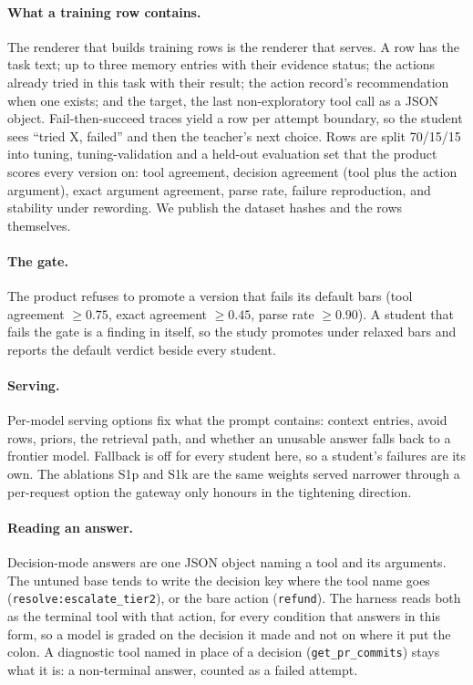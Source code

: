 \documentclass[11pt]{article}
\newcommand{\cond}[1]{\textsf{#1}}
\begin{document}
\paragraph{What a training row contains.} The renderer that builds training rows is the
renderer that serves. A row has the task text; up to three memory entries with their
evidence status; the actions already tried in this task with their result; the action
record's recommendation when one exists; and the target, the last non-exploratory tool call
as a JSON object. Fail-then-succeed traces yield a row per attempt boundary, so the student
sees ``tried X, failed'' and then the teacher's next choice. Rows are split 70/15/15 into
tuning, tuning-validation and a held-out evaluation set that the product scores every
version on: tool agreement, decision agreement (tool plus the action argument), exact
argument agreement, parse rate, failure reproduction, and stability under rewording. We
publish the dataset hashes and the rows themselves.

\paragraph{The gate.} The product refuses to promote a version that fails its default bars
(tool agreement $\geq 0.75$, exact agreement $\geq 0.45$, parse rate $\geq 0.90$). A student
that fails the gate is a finding in itself, so the study promotes under relaxed bars and
reports the default verdict beside every student.

\paragraph{Serving.} Per-model serving options fix what the prompt contains: context
entries, avoid rows, priors, the retrieval path, and whether an unusable answer falls back
to a frontier model. Fallback is off for every student here, so a student's failures are
its own. The ablations \cond{S1p} and \cond{S1k} are the same weights served narrower
through a per-request option the gateway only honours in the tightening direction.

\paragraph{Reading an answer.} Decision-mode answers are one JSON object naming a tool and
its arguments. The untuned base tends to write the decision key where the tool name goes
(\texttt{resolve:escalate\_tier2}), or the bare action (\texttt{refund}). The harness reads
both as the terminal tool with that action, for every condition that answers in this form,
so a model is graded on the decision it made and not on where it put the colon. A
diagnostic tool named in place of a decision (\texttt{get\_pr\_commits}) stays what it is: a
non-terminal answer, counted as a failed attempt.
\end{document}
